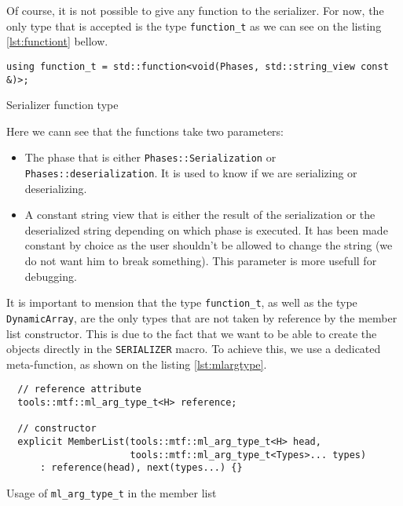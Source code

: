 Of course, it is not possible to give any function to the serializer. For now,
the only type that is accepted is the type \texttt{function\_t} as we can see on
the listing \ref{lst:functiont} bellow.

\begin{listing}[ht!]
\begin{verbatim}
using function_t = std::function<void(Phases, std::string_view const &)>;
\end{verbatim}
\caption{Serializer function type}
\label{lst:functiont}
\end{listing}

Here we cann see that the functions take two parameters:

\begin{itemize}
  \item The phase that is either \texttt{Phases::Serialization} or
    \texttt{Phases::deserialization}. It is used to know if we are serializing
    or deserializing.
  \item A constant string view that is either the result of the serialization or
    the deserialized string depending on which phase is executed. It has been
    made constant by choice as the user shouldn't be allowed to change the
    string (we do not want him to break something). This parameter is more
    usefull for debugging.
\end{itemize}

It is important to mension that the type \texttt{function\_t}, as well as the
type \texttt{DynamicArray}, are the only types that are not taken by reference
by the member list constructor. This is due to the fact that we want to be able
to create the objects directly in the \texttt{SERIALIZER} macro. To achieve
this, we use a dedicated meta-function, as shown on the listing
\ref{lst:mlargtype}.

\begin{listing}[ht!]
\begin{verbatim}
  // reference attribute
  tools::mtf::ml_arg_type_t<H> reference;

  // constructor
  explicit MemberList(tools::mtf::ml_arg_type_t<H> head,
                      tools::mtf::ml_arg_type_t<Types>... types)
      : reference(head), next(types...) {}
\end{verbatim}
\caption{Usage of \texttt{ml\_arg\_type\_t} in the member list}
\label{lst:mlargtype}
\end{listing}

